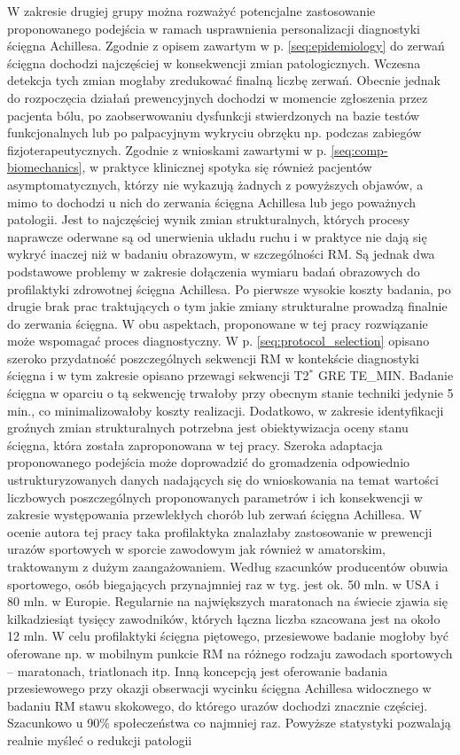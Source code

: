 W zakresie drugiej grupy można rozważyć potencjalne zastosowanie proponowanego podejścia w ramach usprawnienia personalizacji diagnostyki ścięgna Achillesa. Zgodnie z opisem zawartym w p. \ref{seq:epidemiology} do zerwań ścięgna dochodzi najczęściej \linebreak w konsekwencji zmian patologicznych. Wczesna detekcja tych zmian mogłaby zredukować finalną liczbę zerwań. Obecnie jednak do rozpoczęcia działań prewencyjnych dochodzi w momencie zgłoszenia przez pacjenta bólu, po zaobserwowaniu dysfunkcji stwierdzonych na bazie testów funkcjonalnych lub po palpacyjnym wykryciu obrzęku np. podczas zabiegów fizjoterapeutycznych. Zgodnie z wnioskami zawartymi \linebreak w p. \ref{seq:comp-biomechanics}, w praktyce klinicznej spotyka się również pacjentów asymptomatycznych, którzy nie wykazują żadnych z powyższych objawów, a mimo to dochodzi u nich do zerwania ścięgna Achillesa lub jego poważnych patologii. Jest to najczęściej wynik zmian strukturalnych, których procesy naprawcze oderwane są od unerwienia układu ruchu i w praktyce nie dają się wykryć inaczej niż w badaniu obrazowym, w szczególności RM. Są jednak dwa podstawowe problemy w zakresie dołączenia wymiaru badań obrazowych do profilaktyki zdrowotnej ścięgna Achillesa. Po pierwsze wysokie koszty badania, po drugie brak prac traktujących o tym jakie zmiany strukturalne prowadzą finalnie do zerwania ścięgna. W obu aspektach, proponowane w tej pracy rozwiązanie może wspomagać proces diagnostyczny. W p. \ref{seq:protocol_selection} opisano szeroko przydatność poszczególnych sekwencji RM w kontekście diagnostyki ścięgna i w tym zakresie opisano przewagi sekwencji T2$^\ast$ GRE TE\_MIN. Badanie ścięgna w oparciu o tą sekwencję trwałoby przy obecnym stanie techniki jedynie 5 min., co minimalizowałoby koszty realizacji. Dodatkowo, w zakresie identyfikacji groźnych zmian strukturalnych potrzebna jest obiektywizacja oceny stanu ścięgna, która została zaproponowana w tej pracy. Szeroka adaptacja proponowanego podejścia może doprowadzić do gromadzenia odpowiednio ustrukturyzowanych danych nadających się do wnioskowania na temat wartości liczbowych poszczególnych proponowanych parametrów i ich konsekwencji w zakresie występowania przewlekłych chorób lub zerwań ścięgna Achillesa. W ocenie autora tej pracy taka profilaktyka znalazłaby zastosowanie w prewencji urazów sportowych w sporcie zawodowym jak również \linebreak w amatorskim, traktowanym z dużym zaangażowaniem. Według szacunków producentów obuwia sportowego, osób biegających przynajmniej raz w tyg. jest ok. 50 mln. w USA i 80 mln. w Europie. Regularnie na największych maratonach na świecie zjawia się kilkadziesiąt tysięcy zawodników, których łączna liczba szacowana jest na około 12 mln. W celu profilaktyki ścięgna piętowego, przesiewowe badanie mogłoby być oferowane np. w mobilnym punkcie RM na różnego rodzaju zawodach sportowych -- maratonach, triatlonach itp. Inną koncepcją jest oferowanie badania przesiewowego przy okazji obserwacji wycinku ścięgna Achillesa widocznego w badaniu RM stawu skokowego, do którego urazów dochodzi znacznie częściej. Szacunkowo u 90\% społeczeństwa co najmniej raz. Powyższe statystyki pozwalają realnie myśleć o redukcji patologii 